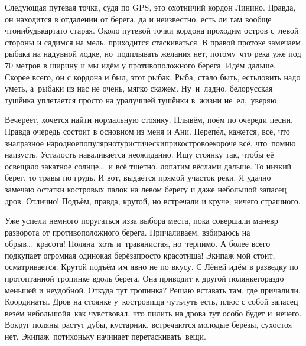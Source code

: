 Следующая путевая точка, судя по GPS, это охотничий кордон Линино. Правда, он находится в отдалении от берега, да и неизвестно, есть ли там вообще что\sdash нибудь\mdash карта\sdash то старая. Около путевой точки кордона проходим остров с~левой стороны и садимся на мель, приходится стаскиваться. В правой протоке замечаем рыбака на надувной лодке, но~подплывать желания нет, потому~что река уже под 70 метров в ширину и мы идём у противоположного берега. Идём дальше. Скорее всего, он с кордона и был, этот рыбак. Рыба, стало быть, есть\mdash ловить надо уметь, а~рыбаки из нас не очень, мягко скажем. Ну~и~ладно, белорусская тушёнка уплетается просто на ура\mdash лучшей тушёнки в~жизни не~ел,~уверяю.

Вечереет, хочется найти нормальную стоянку. Плывём, поём по очереди песни. Правда очередь состоит в основном из меня и Ани. Переп\'{е}л, кажется, всё, что знал\mdash разное народное\sdash популярно\sdash туристически\sdash прикостровое\mdash короче всё, что~помню наизусть. Усталость наваливается неожиданно. Ищу стоянку так, чтобы её освещало закатное солнце\ldots~и всё тщетно, лопатим вёслами дальше. То низкий берег, то травы по грудь. И вот, выдаётся прямой участок реки. Я удачно замечаю остатки костровых палок на левом берегу и даже небольшой запасец дров. Отлично! Подъём, правда, крутой, но встречали и круче, ничего страшного.

Уже успели немного поругаться из\sdash за выбора места, пока совершали манёвр разворота от противоположного берега. Причаливаем, взбираюсь на обрыв\ldots~красота! Поляна~хоть и~травянистая, но~терпимо. А более всего подкупает огромная одинокая берёза\mdash просто красотища! Экипаж мой стоит, осматривается. Крутой подъём им явно не по вкусу. С Лёней идём в разведку по протоптанной тропинке вдоль берега. Она приводит к другой полянке\mdash гораздо меньшей и неудобной. Откуда тут тропинка? 
\newpage
Решаю вставать там, где причалили. Координаты. Дров на стоянке у~костровища чуть\sdash чуть есть, плюс с собой запасец везём небольшой\mdash я~как чувствовал, что пилить на дрова тут особо будет и~нечего. Вокруг поляны растут дубы, кустарник, встречаются молодые берёзы, сухостоя нет. Экипаж~потихоньку начинает перетаскивать~вещи. 

